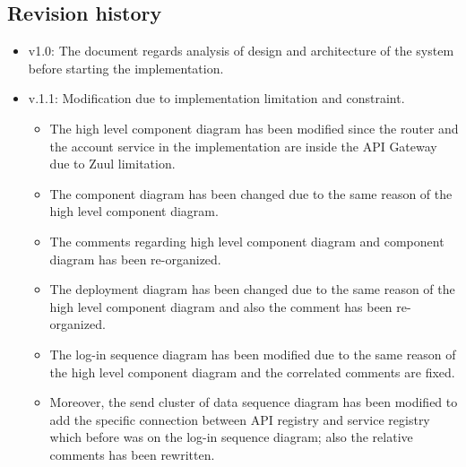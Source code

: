 \subsection{Revision history}
\begin{itemize}
\item v1.0: The document regards analysis of design and architecture of the system before starting the implementation.
\item v.1.1: Modification due to implementation limitation and constraint.
\begin{itemize}
	\item The high level component diagram has been modified since the router and the account service in the implementation are inside the API Gateway due to Zuul limitation.
	\item The component diagram has been changed due to the same reason of the high level component diagram.
	\item The comments regarding high level component diagram and component diagram has been re-organized.
	\item The deployment diagram has been changed due to the same reason of the high level component diagram and also the comment has been re-organized. 
	\item The log-in sequence diagram has been modified due to the same reason of the high level component diagram and the correlated comments are fixed. 
	\item Moreover, the send cluster of data sequence diagram has been modified to add the specific connection between API registry and service registry which before was on the log-in sequence diagram; also the relative comments has been rewritten.
\end{itemize}
\end{itemize}
